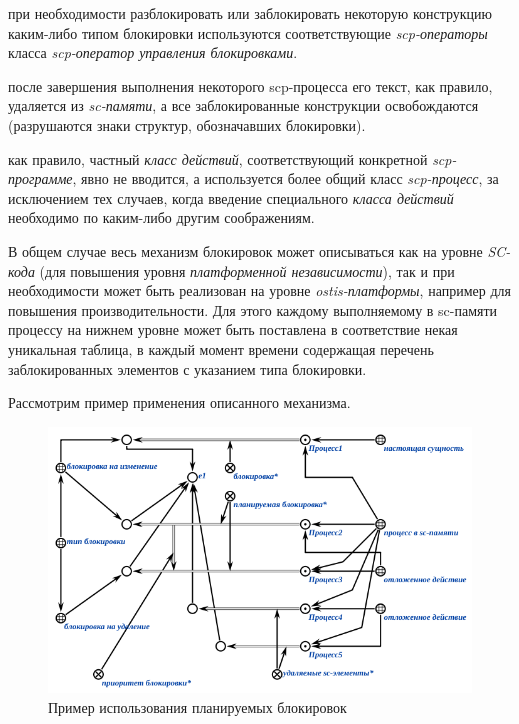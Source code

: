 \begin{textitemize}
\item при необходимости разблокировать или заблокировать некоторую конструкцию каким-либо типом блокировки используются соответствующие \textit{scp-операторы} класса \textit{scp-оператор управления блокировками}.
\item после завершения выполнения некоторого scp-процесса его текст, как правило, удаляется из \textit{sc-памяти}, а все заблокированные конструкции освобождаются (разрушаются знаки структур, обозначавших блокировки).
\item как правило, частный \textit{класс действий}, соответствующий конкретной \textit{scp-программе}, явно не вводится, а используется более общий класс \textit{scp-процесс}, за исключением тех случаев, когда введение	специального \textit{класса действий} необходимо по каким-либо другим соображениям.
\end{textitemize}

В общем случае весь механизм блокировок может описываться как на уровне \textit{SC-кода} (для повышения уровня \textit{платформенной независимости}), так и при необходимости может быть реализован на уровне \textit{ostis-платформы}, например для повышения производительности. Для этого каждому выполняемому в sc-памяти процессу на нижнем уровне может быть поставлена в соответствие некая уникальная таблица, в каждый момент времени содержащая перечень заблокированных элементов с указанием типа блокировки.

Рассмотрим пример применения описанного механизма.

\begin{figure}[h]
	\centering
	\includegraphics[scale=0.8]{images/part3/chapter_situation_management/plan_lock_1.png}
	\caption{Пример использования планируемых блокировок}
	\label{fig:plan_lock_1}
\end{figure}

